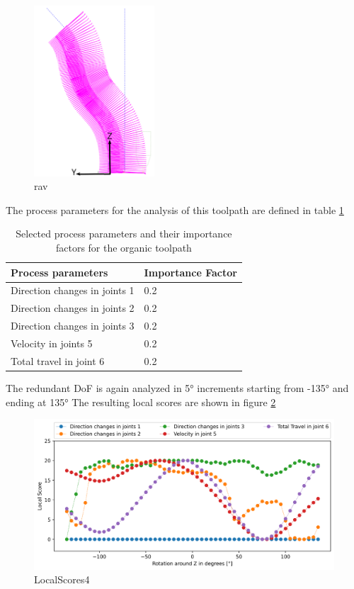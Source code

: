 \begin{figure}[H]
	\centerline{\includegraphics[width=0.4\textwidth]{figures/raven.png}}
	\caption{rav \cite{Reisch.2023}}
	\label{rav}
\end{figure}

The process parameters for the analysis of this toolpath are defined in table \ref{ravenparams}

\begin{table}[H]
	\centering
	\begin{tabular}{||l|l||}
		Process parameters& Importance Factor \\
		\hline
		\hline
		\hline
		Direction changes in joints 1	&		0.2 \\
		Direction changes in joints 2	&		0.2 \\
		Direction changes in joints 3	&		0.2 \\
		Velocity in joints 5	&		0.2 \\
		Total travel in joint 6	&		0.2 \\
		\hline
		\hline
	\end{tabular}
	
	\caption{Selected process parameters and their importance factors for the organic toolpath}
	\label{ravenparams}
\end{table}

The redundant \acrshort{DoF} is again analyzed in 5° increments starting from -135° and ending at 135°
The resulting local scores are shown in figure \ref{LS4}

\begin{figure}[H]
	\centerline{\includegraphics[width=1\textwidth]{figures/LocalScores_4.png}}
	\caption{LocalScores4}
	\label{LS4}
\end{figure}

